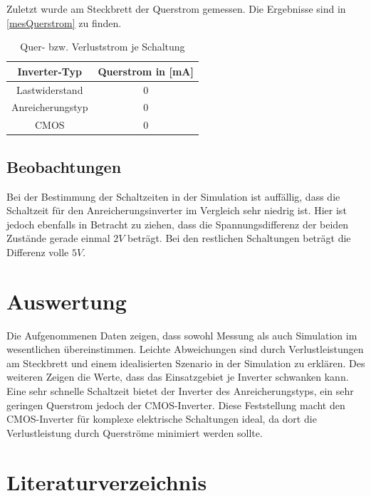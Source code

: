 \documentclass[11pt, a4paper]{article}
\begin{document}
Zuletzt wurde am Steckbrett der Querstrom gemessen. Die Ergebnisse sind in \autoref{mesQuerstrom} zu finden.
\begin{table}[h]
\centering
\begin{tabular}{c|c}
Inverter-Typ & Querstrom in [mA] \\ \hline
Lastwiderstand & $0$ \\
Anreicherungstyp & $0$ \\
CMOS & $0$
\end{tabular}
\caption{Quer- bzw. Verluststrom je Schaltung}
\label{mesQuerstrom}
\end{table}
\subsection*{Beobachtungen}
Bei der Bestimmung der Schaltzeiten in der Simulation ist auffällig, dass die Schaltzeit für den Anreicherungsinverter im Vergleich sehr niedrig ist. Hier ist jedoch ebenfalls in Betracht zu ziehen, dass die Spannungsdifferenz der beiden Zustände gerade einmal $2 V$ beträgt. Bei den restlichen Schaltungen beträgt die Differenz volle $5V$.
\section*{Auswertung}
Die Aufgenommenen Daten zeigen, dass sowohl Messung als auch Simulation im wesentlichen übereinstimmen. Leichte Abweichungen sind durch Verlustleistungen am Steckbrett und einem idealisierten Szenario in der Simulation zu erklären. Des weiteren Zeigen die Werte, dass das Einsatzgebiet je Inverter schwanken kann. Eine sehr schnelle Schaltzeit bietet der Inverter des Anreicherungstyps, ein sehr geringen Querstrom jedoch der CMOS-Inverter. Diese Feststellung macht den CMOS-Inverter für komplexe elektrische Schaltungen ideal, da dort die Verlustleistung durch Querströme minimiert werden sollte.
\section*{Literaturverzeichnis}
\end{document}
